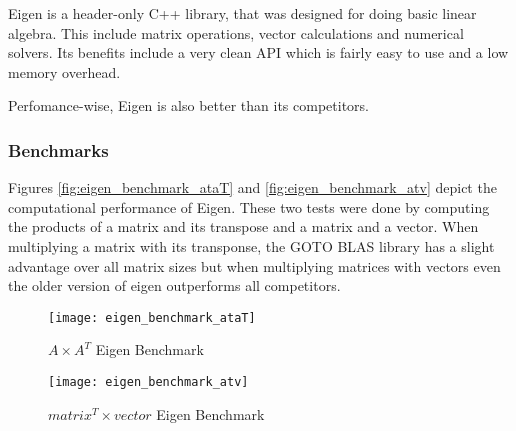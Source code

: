 Eigen is a header-only C++ library, that was designed for doing basic linear algebra. This include matrix operations, vector calculations and numerical solvers. Its benefits include a very clean API which is fairly easy to use and a low memory overhead.

Perfomance-wise, Eigen is also better than its competitors.

\subsubsection{Benchmarks}

Figures \vref{fig:eigen_benchmark_ataT} and \vref{fig:eigen_benchmark_atv} depict the computational performance of Eigen. These two tests were done by computing the products of a matrix and its transpose and a matrix and a vector. When multiplying a matrix with its transponse, the GOTO BLAS library has a slight advantage over all matrix sizes but when multiplying matrices with vectors even the older version of eigen outperforms all competitors.

\begin{figure}[H]
    \centering
    \texttt{[image: eigen\_benchmark\_ataT]}
    \caption[$ A \times A^T $ Eigen Benchmark]{$ A \times A^T $ Eigen Benchmark \autocite{EigenBenchmark}}
    \label{fig:eigen_benchmark_ataT}
\end{figure}

\begin{figure}[H]
    \centering
    \texttt{[image: eigen\_benchmark\_atv]}
    \caption[$ matrix^T \times vector $ Eigen Benchmark]{$ matrix^T \times vector $ Eigen Benchmark \autocite{EigenBenchmark}}
    \label{fig:eigen_benchmark_atv}
\end{figure}
